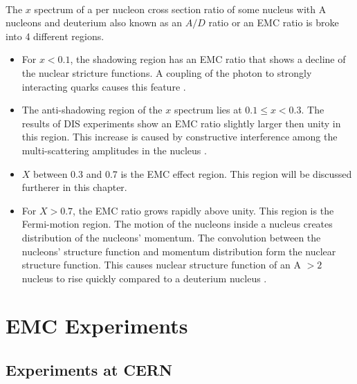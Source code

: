 \paragraph{}The $x$ spectrum of a per nucleon cross section ratio of some nucleus with A nucleons and deuterium also known as an $A/D$ ratio or an EMC ratio is broke into 4 different regions. 
\begin{itemize}
	\item For $x < 0.1$, the shadowing region has an EMC ratio that shows a decline of the nuclear stricture functions. A coupling of the photon to strongly interacting quarks causes this feature \cite{PnN}.
	\item The anti-shadowing region of the $x$ spectrum lies at $0.1 \leq x < 0.3 $. The results of DIS experiments show an EMC ratio slightly larger then unity in this region. This increase is caused by constructive interference among the multi-scattering amplitudes in the nucleus \cite{shadowing}.
	\item $X$ between 0.3 and 0.7 is the EMC effect region. This region will be discussed furtherer in this chapter.
	\item For $X > 0.7$, the EMC ratio grows rapidly above unity.  This region is the Fermi-motion region. The  motion of the nucleons inside a nucleus creates distribution of the nucleons'  momentum. The convolution between the nucleons' structure function and momentum distribution form the nuclear structure function. This causes nuclear structure function of an A $> 2$ nucleus to rise quickly compared to a deuterium nucleus \cite{Ajth,PnN}. 
\end{itemize}
\section{EMC Experiments}
\subsection{Experiments at CERN}
